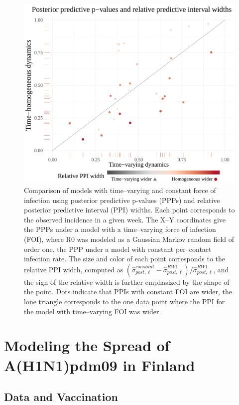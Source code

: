 \begin{figure}[htbp]
	\centering
	\includegraphics[width=0.8\linewidth]{figures/sinfoi_ppi_comp}
	\caption[Comparison with posterior predictive p-values and relative predictive interval widths for SIRS models fit to an outbreak with time--varying dynamics.]{Comparison of models with time--varying and constant force of infection using posterior predictive p-values (PPPs) and relative posterior predictive interval (PPI) widths. Each point corresponds to the observed incidence in a given week. The X--Y coordinates give the PPPs under a model with a time--varying force of infection (FOI), where R0 was modeled as a Gaussian Markov random field of order one, the PPP under a model with constant per--contact infection rate. The size and color of each point corresponds to the relative PPI width, computed as $ (\widehat{\sigma}_{post,\ell}^{constant} - \widehat{\sigma}_{post,\ell}^{RW1})/\widehat{\sigma}_{post,\ell}^{RW1} $, and the sign of the relative width is further emphasized by the shape of the point. Dots indicate that PPIs with constant FOI are wider, the lone triangle corresponds to the one data point where the PPI for the model with time--varying FOI was wider.}
	\label{fig:sinfoi_ppi_comp}
\end{figure}

\newpage
\section{Modeling the Spread of A(H1N1)pdm09 in Finland}
\label{sec:flu_tparam_models}

\subsection{Data and Vaccination}
\label{subsec:flu_datavacc}

